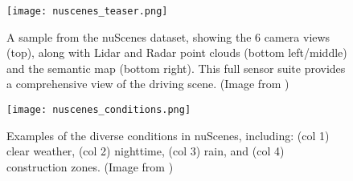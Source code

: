\begin{figure}[h]
\centering
\texttt{[image: nuscenes\_teaser.png]}
\caption{A sample from the nuScenes dataset, showing the 6 camera views (top), along with Lidar and Radar point clouds (bottom left/middle) and the semantic map (bottom right). This full sensor suite provides a comprehensive view of the driving scene. (Image from \citep{caesar2020nuscenes})}
\label{fig:nuscenes_teaser}
\end{figure}

\begin{figure}[h]
\centering
\texttt{[image: nuscenes\_conditions.png]}
\caption{Examples of the diverse conditions in nuScenes, including: (col 1) clear weather, (col 2) nighttime, (col 3) rain, and (col 4) construction zones. (Image from \citep{caesar2020nuscenes})}
\label{fig:nuscenes_conditions}
\end{figure}


